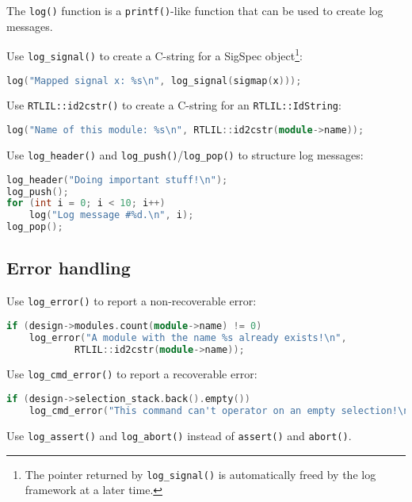 \begin{frame}[t, fragile]{\subsecname}
The {\tt log()} function is a {\tt printf()}-like function that can be used to create log messages.

\medskip
Use {\tt log\_signal()} to create a C-string for a SigSpec object\footnote[frame]{The pointer returned
by {\tt log\_signal()} is automatically freed by the log framework at a later time.}:
\begin{lstlisting}[xleftmargin=1cm, basicstyle=\ttfamily\fontsize{8pt}{10pt}\selectfont, language=C++]
log("Mapped signal x: %s\n", log_signal(sigmap(x)));
\end{lstlisting}

\medskip
Use {\tt RTLIL::id2cstr()} to create a C-string for an {\tt RTLIL::IdString}:
\begin{lstlisting}[xleftmargin=1cm, basicstyle=\ttfamily\fontsize{8pt}{10pt}\selectfont, language=C++]
log("Name of this module: %s\n", RTLIL::id2cstr(module->name));
\end{lstlisting}

\medskip
Use {\tt log\_header()} and {\tt log\_push()}/{\tt log\_pop()} to structure log messages:
\begin{lstlisting}[xleftmargin=1cm, basicstyle=\ttfamily\fontsize{8pt}{10pt}\selectfont, language=C++]
log_header("Doing important stuff!\n");
log_push();
for (int i = 0; i < 10; i++)
    log("Log message #%d.\n", i);
log_pop();
\end{lstlisting}
\end{frame}


\subsection{Error handling}

\begin{frame}[t, fragile]{\subsecname}
Use {\tt log\_error()} to report a non-recoverable error:

\medskip
\begin{lstlisting}[xleftmargin=1cm, basicstyle=\ttfamily\fontsize{8pt}{10pt}\selectfont, language=C++]
if (design->modules.count(module->name) != 0)
    log_error("A module with the name %s already exists!\n",
            RTLIL::id2cstr(module->name));
\end{lstlisting}

\bigskip
Use {\tt log\_cmd\_error()} to report a recoverable error:
\begin{lstlisting}[xleftmargin=1cm, basicstyle=\ttfamily\fontsize{8pt}{10pt}\selectfont, language=C++]
if (design->selection_stack.back().empty())
    log_cmd_error("This command can't operator on an empty selection!\n");
\end{lstlisting}

\bigskip
Use {\tt log\_assert()} and {\tt log\_abort()} instead of {\tt assert()} and {\tt abort()}.
\end{frame}


